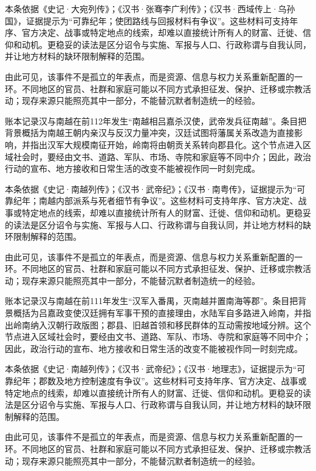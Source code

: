 本条依据《史记·大宛列传》；《汉书·张骞李广利传》；《汉书·西域传上·乌孙国》，证据提示为“可靠纪年；使团路线与回报材料有争议”。这些材料可支持年序、官方决定、战事或特定地点的线索，却难以直接统计所有人的财富、迁徙、信仰和动机。更稳妥的读法是区分诏令与实施、军报与人口、行政称谓与自我认同，并让地方材料的缺环限制解释的范围。

由此可见，该事件不是孤立的年表点，而是资源、信息与权力关系重新配置的一环。不同地区的官员、社群和家庭可能以不同方式承担征发、保护、迁移或宗教活动；现存来源只能照亮其中一部分，不能替沉默者制造统一的经验。

账本记录汉与南越在前112年发生“南越相吕嘉杀汉使，武帝发兵征南越”。条目把背景概括为南越王朝内亲汉与反汉力量冲突，汉廷试图将藩属关系改造为直接影响，并指出汉军大规模南征开始，岭南将由朝贡关系转向郡县化。这个节点进入区域社会时，要经由文书、道路、军队、市场、寺院和家庭等不同中介；因此，政治行动的宣布、地方接收和日常生活的改变不能被视作同一时刻完成。

本条依据《史记·南越列传》；《汉书·武帝纪》；《汉书·南粤传》，证据提示为“可靠纪年；南越内部派系与死者细节有争议”。这些材料可支持年序、官方决定、战事或特定地点的线索，却难以直接统计所有人的财富、迁徙、信仰和动机。更稳妥的读法是区分诏令与实施、军报与人口、行政称谓与自我认同，并让地方材料的缺环限制解释的范围。

由此可见，该事件不是孤立的年表点，而是资源、信息与权力关系重新配置的一环。不同地区的官员、社群和家庭可能以不同方式承担征发、保护、迁移或宗教活动；现存来源只能照亮其中一部分，不能替沉默者制造统一的经验。

账本记录汉与南越在前111年发生“汉军入番禺，灭南越并置南海等郡”。条目把背景概括为吕嘉政变使汉廷拥有军事干预的直接理由，水陆军自多路进入岭南，并指出岭南纳入汉朝行政版图；郡县、旧越首领和移民群体的互动需按地域分辨。这个节点进入区域社会时，要经由文书、道路、军队、市场、寺院和家庭等不同中介；因此，政治行动的宣布、地方接收和日常生活的改变不能被视作同一时刻完成。

本条依据《史记·南越列传》；《汉书·武帝纪》；《汉书·地理志》，证据提示为“可靠纪年；郡数及地方控制速度有争议”。这些材料可支持年序、官方决定、战事或特定地点的线索，却难以直接统计所有人的财富、迁徙、信仰和动机。更稳妥的读法是区分诏令与实施、军报与人口、行政称谓与自我认同，并让地方材料的缺环限制解释的范围。

由此可见，该事件不是孤立的年表点，而是资源、信息与权力关系重新配置的一环。不同地区的官员、社群和家庭可能以不同方式承担征发、保护、迁移或宗教活动；现存来源只能照亮其中一部分，不能替沉默者制造统一的经验。

